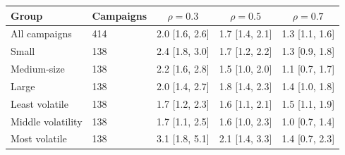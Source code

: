 \begin{tabular}{llccc}
\toprule
Group & Campaigns & $\rho{=}0.3$ & $\rho{=}0.5$ & $\rho{=}0.7$ \\
\midrule
All campaigns & 414 & 2.0 [1.6, 2.6] & 1.7 [1.4, 2.1] & 1.3 [1.1, 1.6] \\
\addlinespace[2pt]
Small & 138 & 2.4 [1.8, 3.0] & 1.7 [1.2, 2.2] & 1.3 [0.9, 1.8] \\
Medium-size & 138 & 2.2 [1.6, 2.8] & 1.5 [1.0, 2.0] & 1.1 [0.7, 1.7] \\
Large & 138 & 2.0 [1.4, 2.7] & 1.8 [1.4, 2.3] & 1.4 [1.0, 1.8] \\
\addlinespace[2pt]
Least volatile & 138 & 1.7 [1.2, 2.3] & 1.6 [1.1, 2.1] & 1.5 [1.1, 1.9] \\
Middle volatility & 138 & 1.7 [1.1, 2.5] & 1.6 [1.0, 2.3] & 1.0 [0.7, 1.4] \\
Most volatile & 138 & 3.1 [1.8, 5.1] & 2.1 [1.4, 3.3] & 1.4 [0.7, 2.3] \\
\bottomrule
\end{tabular}
